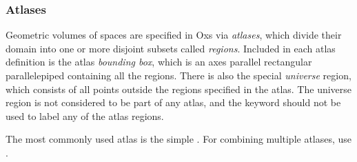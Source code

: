 \subsubsection{Atlases\label{sec:oxsAtlases}}
Geometric volumes of spaces are specified in Oxs via \textit{atlases},
which divide their domain into one or more disjoint subsets called
\textit{regions}.  Included in each atlas definition is the atlas
\textit{bounding box}, which is an axes parallel rectangular
parallelepiped containing all the regions.  There is also the special
\textit{universe} region, which consists of all points outside the
regions specified in the atlas.  The universe region is not considered
to be part of any atlas, and the  keyword should not be
used to label any of the atlas regions.

The most commonly used atlas is the simple .  For
combining multiple atlases, use .

